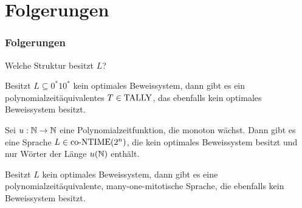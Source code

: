 \section{Folgerungen} 

\begin{frame}
  \frametitle{Folgerungen}

  \pause

  Welche Struktur besitzt \(L\)?
  
  \pause
  
  \begin{theorem}
    Besitzt \(L \subseteq 0^*10^*\) kein optimales Beweissystem, dann gibt es ein polynomialzeitäquivalentes \(T \in \text{TALLY}\), das ebenfalls kein optimales Beweissystem besitzt.
  \end{theorem}

  \pause
  
  \begin{corollary}
    Sei \(u : \mathbb{N} \to \mathbb{N}\) eine Polynomialzeitfunktion, die monoton wächst. Dann gibt es eine Sprache \(L \in \text{co-NTIME}(2^n)\), die kein optimales Beweissystem besitzt und nur Wörter der Länge \(u(\mathbb{N})\) enthält.
  \end{corollary}

  \pause

  \begin{theorem}
    Besitzt \(L\) kein optimales Beweissystem, dann gibt es eine polynomialzeitäquivalente, many-one-mitotische Sprache, die ebenfalls kein Beweissystem besitzt.
  \end{theorem}



\end{frame}
